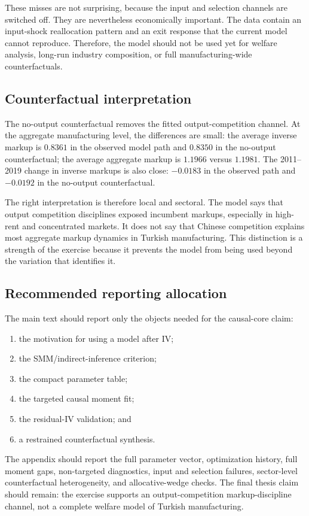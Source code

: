 \documentclass[11pt,a4paper]{article}
\begin{document}
These misses are not surprising, because the input and selection channels are switched off. They are nevertheless economically important. The data contain an input-shock reallocation pattern and an exit response that the current model cannot reproduce. Therefore, the model should not be used yet for welfare analysis, long-run industry composition, or full manufacturing-wide counterfactuals.

\subsection{Counterfactual interpretation}

The no-output counterfactual removes the fitted output-competition channel. At the aggregate manufacturing level, the differences are small: the average inverse markup is \(0.8361\) in the observed model path and \(0.8350\) in the no-output counterfactual; the average aggregate markup is \(1.1966\) versus \(1.1981\). The 2011--2019 change in inverse markups is also close: \(-0.0183\) in the observed path and \(-0.0192\) in the no-output counterfactual.

The right interpretation is therefore local and sectoral. The model says that output competition disciplines exposed incumbent markups, especially in high-rent and concentrated markets. It does not say that Chinese competition explains most aggregate markup dynamics in Turkish manufacturing. This distinction is a strength of the exercise because it prevents the model from being used beyond the variation that identifies it.

\subsection{Recommended reporting allocation}

The main text should report only the objects needed for the causal-core claim:
\begin{enumerate}
    \item the motivation for using a model after IV;
    \item the SMM/indirect-inference criterion;
    \item the compact parameter table;
    \item the targeted causal moment fit;
    \item the residual-IV validation; and
    \item a restrained counterfactual synthesis.
\end{enumerate}
The appendix should report the full parameter vector, optimization history, full moment gaps, non-targeted diagnostics, input and selection failures, sector-level counterfactual heterogeneity, and allocative-wedge checks. The final thesis claim should remain: the exercise supports an output-competition markup-discipline channel, not a complete welfare model of Turkish manufacturing.
\end{document}
